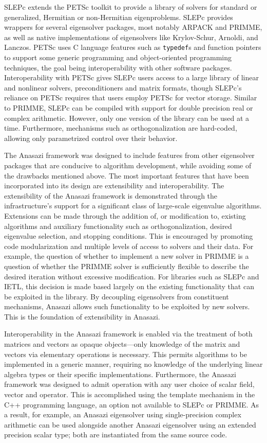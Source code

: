 \documentclass[acmtoms,acmnow]{acmtrans2m}
\begin{document}
SLEPc extends the PETSc toolkit to provide a library of solvers for standard or
generalized, Hermitian or non-Hermitian eigenproblems. SLEPc provides wrappers for several
eigensolver packages, most notably ARPACK and PRIMME, as well as native implementations of
eigensolvers like Krylov-Schur, Arnoldi, and Lanczos. PETSc uses C language features such
as \texttt{typedef}s and function pointers to support some generic programming and
object-oriented programming techniques, the goal being interoperability with other
software packages. Interoperability with PETSc gives SLEPc users access to a large library
of linear and nonlinear solvers, preconditioners and matrix formats, though SLEPc's
reliance on PETSc requires that users employ PETSc for vector storage. Similar to PRIMME,
SLEPc can be compiled with support for double precision real or complex arithmetic.
However, only one version of the library can be used at a time. Furthermore, mechanisms
such as orthogonalization are hard-coded, allowing only parametrized control over their
behavior. 

The Anasazi framework was designed to include features from other eigensolver packages
that are conducive to algorithm development, while avoiding some of the drawbacks
mentioned above. The most important features that have been incorporated into its design
are extensibility and interoperability. The extensibility of the Anasazi framework is
demonstrated through the infrastructure's support for a significant class of large-scale
eigenvalue algorithms. Extensions can be made through the addition of, or modification to,
existing algorithms and auxiliary functionality such as orthogonalization, desired
eigenvalue selection, and stopping conditions. This is encouraged by promoting code
modularization and multiple levels of access to solvers and their data. For example, the
question of whether to implement a new solver in PRIMME is a question of whether the
PRIMME solver is sufficiently flexible to describe the desired iteration without excessive
modification. For libraries such as SLEPc and IETL, this decision is made based largely on
the existing functionality that can be exploited in the library. By decoupling
eigensolvers from constituent mechanisms, Anasazi allows such functionality to be
exploited by new solvers. This is the foundation of extensibility in Anasazi.

Interoperability in the Anasazi framework is enabled via the treatment of both matrices
and vectors as opaque objects---only knowledge of the matrix and vectors via elementary
operations is necessary. This permits algorithms to be implemented in a generic manner,
requiring no knowledge of the underlying linear algebra types or their specific
implementations. Furthermore, the Anasazi framework was designed to admit operation with
any user choice of scalar field, vector and operator. This is accomplished using the
template mechanism in the C++ programming language, an option not available to SLEPc or
PRIMME. As a result, for example, an Anasazi eigensolver using single-precision complex
arithmetic can be used alongside another Anasazi eigensolver using an extended precision
scalar type; both are instantiated from the same source code.
\end{document}

